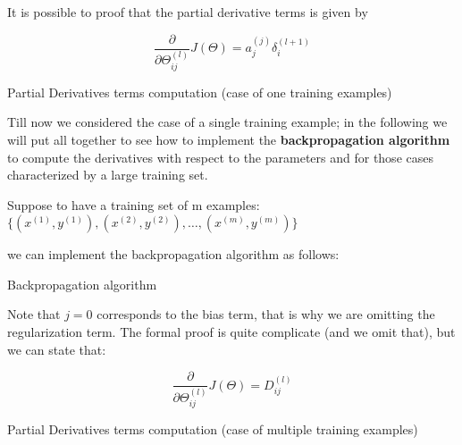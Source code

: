 It is possible to proof that the partial derivative terms is given by

\begin{eqfloat}[H]
\begin{equation}
\frac{\partial}{\partial \Theta_{ij}^{(l)}} J(\Theta) = a_j^{(j)} \delta_i^{(l+1)}
\end{equation}
      \addtocounter{equation}{-1}
        \caption{ Partial Derivatives terms computation (case of one training examples)}
        \label{eq:partderivcomp}
    \end{eqfloat}

Till now we considered the case of a single training example; in the following we will put all together to see how to implement the {\bf backpropagation algorithm} to compute the derivatives with respect to the parameters and for those cases characterized by a large training set.


Suppose to have a training set of m examples:\\

$\{ (x^{(1)},y^{(1)} ), (x^{(2)},y^{(2)} ), \hdots, (x^{(m)},y^{(m)} ) \}$

we can implement the backpropagation algorithm as follows:


\begin{algorithm}
\footnotesize
\caption{Backpropagation algorithm}\label{backpropalg}
\label{algorithm}
\end{algorithm}

Note that $j = 0$ corresponds to the bias term, that is why we are omitting the regularization term. The formal proof is quite complicate (and we omit that), but we can state that:


\begin{eqfloat}[H]
\begin{equation}
\frac{\partial}{\partial \Theta_{ij}^{(l)}} J(\Theta) = D_{ij}^{(l)}
\end{equation}
      \addtocounter{equation}{-1}
        \caption{ Partial Derivatives terms computation (case of multiple training examples) }
        \label{eq:partderivcomp1}
    \end{eqfloat}


